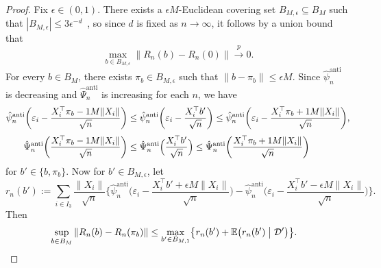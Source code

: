 \documentclass[a4paper]{article}
\newcommand{\E}{\mathbb{E}}
\newcommand{\norm}[1]{\|{#1}\|}
\newcommand{\cvp}{\overset{p}{\to}}
\theoremstyle{definition}
\begin{document}
\begin{proof}
Fix $\epsilon \in (0,1)$. There exists a $\epsilon M$-Euclidean covering set $B_{M,\epsilon} \subseteq B_M$ such that $|B_{M,\epsilon}| \leq 3\epsilon^{-d}$~\citep[e.g.][Example~5.8]{wainwright2019high}, so since $d$ is fixed as $n \to \infty$, it follows by a union bound that
\[
\max_{b \in B_{M,\epsilon}}\norm{R_n(b) - R_n(0)} \cvp 0.
\]
For every $b \in B_M$, there exists $\pi_b \in B_{M,\epsilon}$ such that $\norm{b - \pi_b} \leq \epsilon M$. Since $\hat{\psi}_n^{\mathrm{anti}}$ is decreasing and $\hat{\Psi}_n^{\mathrm{anti}}$ is increasing for each $n$, we have 
\begin{align*}
\hat{\psi}_n^{\mathrm{anti}}\biggl(\varepsilon_i - \frac{X_i^\top\pi_b - \epsilon M\norm{X_i}}{\sqrt{n}}\biggr) &\leq \hat{\psi}_n^{\mathrm{anti}}\biggl(\varepsilon_i - \frac{X_i^\top b'}{\sqrt{n}}\biggr) \leq \hat{\psi}_n^{\mathrm{anti}}\biggl(\varepsilon_i - \frac{X_i^\top\pi_b + \epsilon M\norm{X_i}}{\sqrt{n}}\biggr), \\[3pt]
\hat{\Psi}_n^{\mathrm{anti}}\biggl(\frac{X_i^\top\pi_b - \epsilon M\norm{X_i}}{\sqrt{n}}\biggr) &\leq \hat{\Psi}_n^{\mathrm{anti}}\Bigl(\frac{X_i^\top b'}{\sqrt{n}}\Bigr) \leq \hat{\Psi}_n^{\mathrm{anti}}\biggl(\frac{X_i^\top\pi_b + \epsilon M\norm{X_i}}{\sqrt{n}}\biggr)
\end{align*}
for $b' \in \{b,\pi_b\}$. Now for $b' \in B_{M,\epsilon}$, let
\[
r_n(b') := \sum_{i \in I_3} \frac{\norm{X_i}}{\sqrt{n}} \biggl\{\hat{\psi}_n^{\mathrm{anti}}\biggl(\varepsilon_i - \frac{X_i^\top b' + \epsilon M\norm{X_i}}{\sqrt{n}}\biggr) - \hat{\psi}_n^{\mathrm{anti}}\biggl(\varepsilon_i - \frac{X_i^\top b' - \epsilon M\norm{X_i}}{\sqrt{n}}\biggr)\biggr\}.
\]
Then
\begin{align*}
&\sup_{b \in B_M}\|R_n(b) - R_n(\pi_b)\| \leq \max_{b' \in B_{M,\epsilon}} \bigl\{r_n(b') + \E\bigl(r_n(b') \bigm| \mathcal{D}'\bigr)\bigr\}.
\end{align*}

\end{proof}
\end{document}
